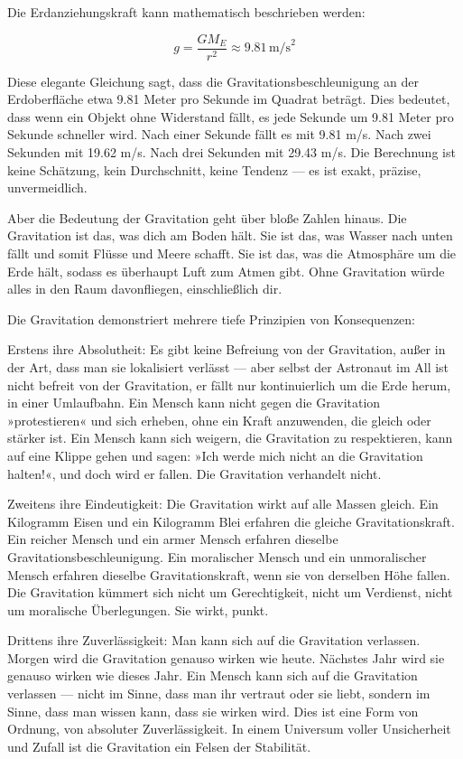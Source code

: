 \documentclass[12pt,a4paper]{article}
\begin{document}
Die Erdanziehungskraft kann mathematisch beschrieben werden:

\begin{equation}
g = \frac{GM_E}{r^2} \approx 9.81 \, \text{m/s}^2
\end{equation}

Diese elegante Gleichung sagt, dass die Gravitationsbeschleunigung an der Erdoberfläche etwa 9.81 Meter pro Sekunde im Quadrat beträgt. Dies bedeutet, dass wenn ein Objekt ohne Widerstand fällt, es jede Sekunde um 9.81 Meter pro Sekunde schneller wird. Nach einer Sekunde fällt es mit 9.81 m/s. Nach zwei Sekunden mit 19.62 m/s. Nach drei Sekunden mit 29.43 m/s. Die Berechnung ist keine Schätzung, kein Durchschnitt, keine Tendenz — es ist exakt, präzise, unvermeidlich.

Aber die Bedeutung der Gravitation geht über bloße Zahlen hinaus. Die Gravitation ist das, was dich am Boden hält. Sie ist das, was Wasser nach unten fällt und somit Flüsse und Meere schafft. Sie ist das, was die Atmosphäre um die Erde hält, sodass es überhaupt Luft zum Atmen gibt. Ohne Gravitation würde alles in den Raum davonfliegen, einschließlich dir.

Die Gravitation demonstriert mehrere tiefe Prinzipien von Konsequenzen:

Erstens ihre Absolutheit: Es gibt keine Befreiung von der Gravitation, außer in der Art, dass man sie lokalisiert verlässt — aber selbst der Astronaut im All ist nicht befreit von der Gravitation, er fällt nur kontinuierlich um die Erde herum, in einer Umlaufbahn. Ein Mensch kann nicht gegen die Gravitation »protestieren« und sich erheben, ohne ein Kraft anzuwenden, die gleich oder stärker ist. Ein Mensch kann sich weigern, die Gravitation zu respektieren, kann auf eine Klippe gehen und sagen: »Ich werde mich nicht an die Gravitation halten!«, und doch wird er fallen. Die Gravitation verhandelt nicht.

Zweitens ihre Eindeutigkeit: Die Gravitation wirkt auf alle Massen gleich. Ein Kilogramm Eisen und ein Kilogramm Blei erfahren die gleiche Gravitationskraft. Ein reicher Mensch und ein armer Mensch erfahren dieselbe Gravitationsbeschleunigung. Ein moralischer Mensch und ein unmoralischer Mensch erfahren dieselbe Gravitationskraft, wenn sie von derselben Höhe fallen. Die Gravitation kümmert sich nicht um Gerechtigkeit, nicht um Verdienst, nicht um moralische Überlegungen. Sie wirkt, punkt.

Drittens ihre Zuverlässigkeit: Man kann sich auf die Gravitation verlassen. Morgen wird die Gravitation genauso wirken wie heute. Nächstes Jahr wird sie genauso wirken wie dieses Jahr. Ein Mensch kann sich auf die Gravitation verlassen — nicht im Sinne, dass man ihr vertraut oder sie liebt, sondern im Sinne, dass man wissen kann, dass sie wirken wird. Dies ist eine Form von Ordnung, von absoluter Zuverlässigkeit. In einem Universum voller Unsicherheit und Zufall ist die Gravitation ein Felsen der Stabilität.
\end{document}
